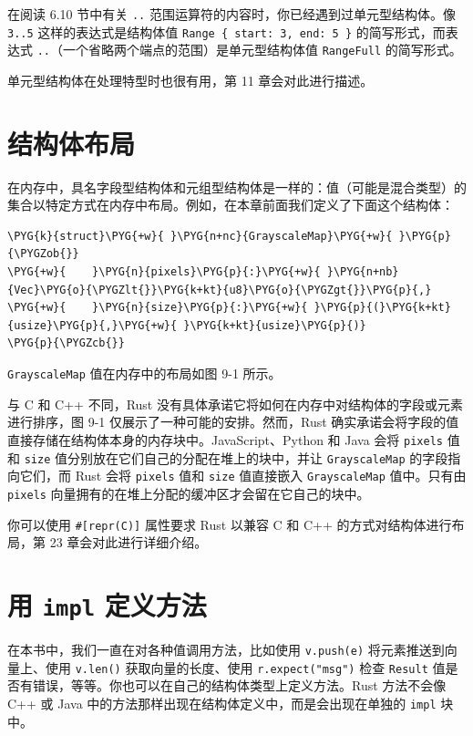 在阅读 6.10 节中有关 \texttt{..} 范围运算符的内容时，你已经遇到过单元型结构体。像 \texttt{3..5} 这样的表达式是结构体值 \texttt{Range \{ start: 3, end: 5 \}} 的简写形式，而表达式 \texttt{..}（一个省略两个端点的范围）是单元型结构体值 \texttt{RangeFull} 的简写形式。

单元型结构体在处理特型时也很有用，第 11 章会对此进行描述。

\section{结构体布局}

在内存中，具名字段型结构体和元组型结构体是一样的：值（可能是混合类型）的集合以特定方式在内存中布局。例如，在本章前面我们定义了下面这个结构体：

\begin{Verbatim}[commandchars=\\\{\},breaklines=true,breakanywhere=true,fontsize=\codefont,xleftmargin=17bp]
\PYG{k}{struct}\PYG{+w}{ }\PYG{n+nc}{GrayscaleMap}\PYG{+w}{ }\PYG{p}{\PYGZob{}}
\PYG{+w}{    }\PYG{n}{pixels}\PYG{p}{:}\PYG{+w}{ }\PYG{n+nb}{Vec}\PYG{o}{\PYGZlt{}}\PYG{k+kt}{u8}\PYG{o}{\PYGZgt{}}\PYG{p}{,}
\PYG{+w}{    }\PYG{n}{size}\PYG{p}{:}\PYG{+w}{ }\PYG{p}{(}\PYG{k+kt}{usize}\PYG{p}{,}\PYG{+w}{ }\PYG{k+kt}{usize}\PYG{p}{)}
\PYG{p}{\PYGZcb{}}
\end{Verbatim}

\texttt{GrayscaleMap} 值在内存中的布局如图 9-1 所示。


与 C 和 C++ 不同，Rust 没有具体承诺它将如何在内存中对结构体的字段或元素进行排序，图 9-1 仅展示了一种可能的安排。然而，Rust 确实承诺会将字段的值直接存储在结构体本身的内存块中。JavaScript、Python 和 Java 会将 \texttt{pixels} 值和 \texttt{size} 值分别放在它们自己的分配在堆上的块中，并让 \texttt{GrayscaleMap} 的字段指向它们，而 Rust 会将 \texttt{pixels} 值和 \texttt{size} 值直接嵌入 \texttt{GrayscaleMap} 值中。只有由 \texttt{pixels} 向量拥有的在堆上分配的缓冲区才会留在它自己的块中。

你可以使用 \texttt{\#[repr(C)]} 属性要求 Rust 以兼容 C 和 C++ 的方式对结构体进行布局，第 23 章会对此进行详细介绍。

\section{用 \texttt{impl} 定义方法}

在本书中，我们一直在对各种值调用方法，比如使用 \texttt{v.push(e)} 将元素推送到向量上、使用 \texttt{v.len()} 获取向量的长度、使用 \texttt{r.expect("msg")} 检查 \texttt{Result} 值是否有错误，等等。你也可以在自己的结构体类型上定义方法。Rust 方法不会像 C++ 或 Java 中的方法那样出现在结构体定义中，而是会出现在单独的 \texttt{impl} 块中。

